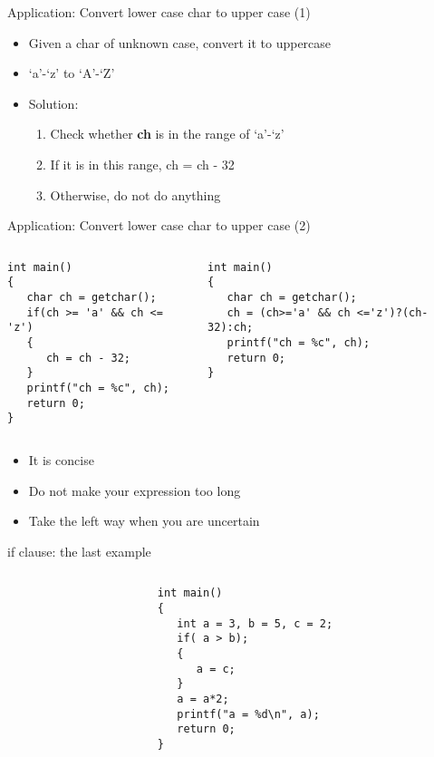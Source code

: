 \begin{frame}[fragile]{Application: Convert lower case char to upper case (1)}
\begin{itemize}
	\item {Given a char of unknown case,  convert it to uppercase}
	\item {`a'-`z' to `A'-`Z'}
	\item {Solution:}
	\begin{enumerate}
		\item {Check whether \textbf{ch} is in the range of `a'-`z'}
		\item {If it is in this range, ch = ch - 32}
		\item {Otherwise, do not do anything}
	\end{enumerate}
\end{itemize}
\end{frame}

\begin{frame}[fragile]{Application: Convert lower case char to upper case (2)}
\begin{columns}
\begin{column}{0.5\linewidth}
\begin{lstlisting}[basicstyle=\footnotesize, xleftmargin=0.02\linewidth]
int main()
{  
   char ch = getchar();
   if(ch >= 'a' && ch <= 'z')
   {
      ch = ch - 32;
   }
   printf("ch = %c", ch);
   return 0;
}
\end{lstlisting}
\end{column}
\begin{column}{0.5\linewidth}
\begin{lstlisting}[basicstyle=\footnotesize, xleftmargin=0.02\linewidth]
int main()
{  
   char ch = getchar();
   ch = (ch>='a' && ch <='z')?(ch-32):ch;
   printf("ch = %c", ch);
   return 0;
}
\end{lstlisting}
\end{column}
\end{columns}
\begin{itemize}
	\item {It is concise}
	\item {Do not make your expression too long}
	\item {Take the left way when you are uncertain}
\end{itemize}
\end{frame}

\begin{frame}[fragile]{if clause: the last example}
\begin{columns}
\begin{column}{0.05\linewidth}
\end{column}
\begin{column}{0.48\linewidth}
\begin{lstlisting}[]
int main()
{
   int a = 3, b = 5, c = 2;
   if( a > b);
   {
      a = c;
   }
   a = a*2;
   printf("a = %d\n", a);
   return 0;
}
\end{lstlisting}
\end{column}
\end{columns}
\end{frame}


